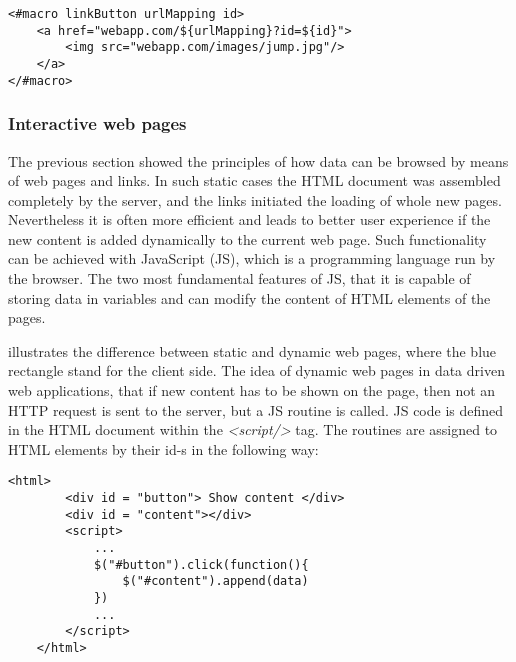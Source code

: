 \begin{lstlisting}[captionpos=b, caption=Template file example, label=skullJSON, belowskip=1em, aboveskip=2em,
basicstyle=\footnotesize,frame=single]
<#macro linkButton urlMapping id>
	<a href="webapp.com/${urlMapping}?id=${id}">
		<img src="webapp.com/images/jump.jpg"/>
	</a>
</#macro>
\end{lstlisting}



\newpage

\subsubsection{Interactive web pages}

The previous section showed the principles of how data can be browsed by means of web pages and links. In such static cases the HTML document was assembled completely by the server, and the links initiated the loading of whole new pages. Nevertheless it is often more efficient and leads to better user experience if the new content is added dynamically to the current web page. Such functionality can be achieved with JavaScript (JS), which is a programming language run by the browser. The two most fundamental features of JS, that it is capable of storing data in variables and can modify the content of HTML elements of the pages. 


 illustrates the difference between static and dynamic web pages, where the blue rectangle stand for the client side. The idea of dynamic web pages in data driven web applications, that if new content has to be shown on the page, then not an HTTP request is sent to the server, but a JS routine is called. JS code is defined in the HTML document within the \textit{<script/>} tag. The routines are assigned to HTML elements by their id-s in the following way:

\begin{lstlisting}[captionpos=b, caption=JavaScript routine assigned to an HTML element, label=jsListing, belowskip=1em, aboveskip=2em,
basicstyle=\footnotesize,frame=single]
	<html>
		<div id = "button"> Show content </div>
		<div id = "content"></div>
		<script>
			...
			$("#button").click(function(){
				$("#content").append(data)
			})
			...	
		</script>
	</html>
\end{lstlisting}


